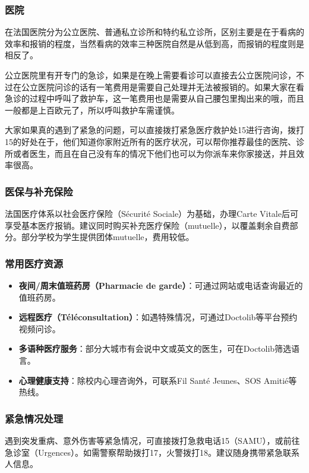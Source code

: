 \subsubsection{医院}
在法国医院分为公立医院、普通私立诊所和特约私立诊所，区别主要是在于看病的效率和报销的程度，当然看病的效率三种医院自然是从低到高，而报销的程度则是相反了。

公立医院里有开专门的急诊，如果是在晚上需要看诊可以直接去公立医院问诊，不过在公立医院问诊的话有一笔费用是需要自己处理并无法被报销的。如果大家在看急诊的过程中呼叫了救护车，这一笔费用也是需要从自己腰包里掏出来的哦，而且一般都是上百欧元了，所以呼叫救护车需谨慎。

大家如果真的遇到了紧急的问题，可以直接拨打紧急医疗救护处15进行咨询，拨打15的好处在于，他们知道你家附近所有的医疗状况，可以帮你推荐最佳的医院、诊所或者医生，而且在自己没有车的情况下他们也可以为你派车来你家接送，并且效率很高。

\subsubsection{医保与补充保险}
法国医疗体系以社会医疗保险（Sécurité Sociale）为基础，办理Carte Vitale后可享受基本医疗报销。建议同时购买补充医疗保险（mutuelle），以覆盖剩余自费部分。部分学校为学生提供团体mutuelle，费用较低。

\subsubsection{常用医疗资源}
\begin{itemize}
    \item \textbf{夜间/周末值班药房（Pharmacie de garde）}：可通过网站或电话查询最近的值班药房。
    \item \textbf{远程医疗（Téléconsultation）}：如遇特殊情况，可通过Doctolib等平台预约视频问诊。
    \item \textbf{多语种医疗服务}：部分大城市有会说中文或英文的医生，可在Doctolib筛选语言。
    \item \textbf{心理健康支持}：除校内心理咨询外，可联系Fil Santé Jeunes、SOS Amitié等热线。
\end{itemize}

\subsubsection{紧急情况处理}
遇到突发重病、意外伤害等紧急情况，可直接拨打急救电话15（SAMU），或前往急诊室（Urgences）。如需警察帮助拨打17，火警拨打18。建议随身携带紧急联系人信息。

